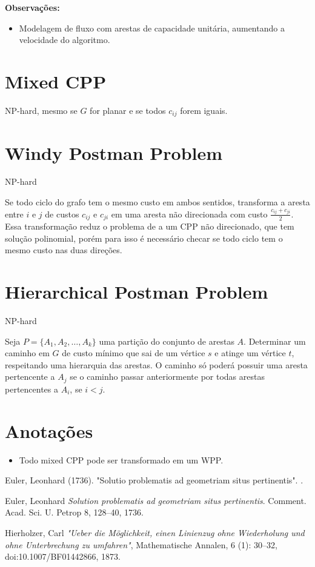 \documentclass{article}
\begin{document}
\textbf{Observações:}
\begin{itemize}
    \item Modelagem de fluxo com arestas de capacidade unitária, aumentando a velocidade do algoritmo.
\end{itemize}

\section{Mixed CPP}

NP-hard, mesmo se $G$ for planar e se todos $c_{ij}$ forem iguais.



\section{Windy Postman Problem}

NP-hard

Se todo ciclo do grafo tem o mesmo custo em ambos sentidos, transforma a aresta entre $i$ e $j$ de custos $c_{ij}$ e $c_{ji}$ em uma aresta não direcionada com custo $\frac{c_{ij} + c_{ji}}{2}$. Essa transformação reduz o problema de a um CPP não direcionado, que tem solução polinomial, porém para isso é necessário checar se todo ciclo tem o mesmo custo nas duas direções.

\section{Hierarchical Postman Problem}

NP-hard 

Seja $P = \{A_1, A_2, \dots, A_k\}$ uma partição do conjunto de arestas $A$. Determinar um caminho em $G$ de custo mínimo que sai de um vértice $s$ e atinge um vértice $t$, respeitando uma hierarquia das arestas. O caminho só poderá possuir uma aresta pertencente a $A_j$ se o caminho passar anteriormente por todas arestas pertencentes a $A_i$, se $i < j$.


\section{Anotações}

\begin{itemize}
    \item Todo mixed CPP pode ser transformado em um WPP.
\end{itemize}

\medskip

Euler, Leonhard (1736). "Solutio problematis ad geometriam situs pertinentis". .

\begin{thebibliography}{9}
Euler, Leonhard
\textit{Solution problematis ad geometriam situs pertinentis}. 
Comment. Acad. Sci. U. Petrop 8, 128–40, 1736.

Hierholzer, Carl
\textit{"Ueber die Möglichkeit, einen Linienzug ohne Wiederholung und ohne Unterbrechung zu umfahren"}, 
Mathematische Annalen, 6 (1): 30–32, doi:10.1007/BF01442866, 1873.
\end{thebibliography}
 
\end{document}
